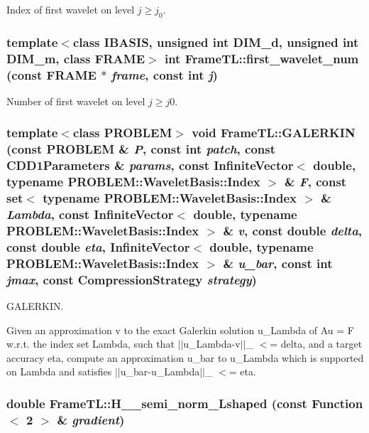 Index of first wavelet on level $j \geq j_0$. \hypertarget{namespaceFrameTL_d2a45d507a64c17ff1cf1edeb7afcd8e}{
\subsubsection[first\_\-wavelet\_\-num]{\setlength{\rightskip}{0pt plus 5cm}template$<$class IBASIS, unsigned int DIM\_\-d, unsigned int DIM\_\-m, class FRAME$>$ int FrameTL::first\_\-wavelet\_\-num (const FRAME $\ast$ {\em frame}, \/  const int {\em j})}}
\label{namespaceFrameTL_d2a45d507a64c17ff1cf1edeb7afcd8e}


Number of first wavelet on level $j \geq j0$. \hypertarget{namespaceFrameTL_5338ae7f2ce93a8449560cc020fa212a}{
\subsubsection[GALERKIN]{\setlength{\rightskip}{0pt plus 5cm}template$<$class PROBLEM$>$ void FrameTL::GALERKIN (const PROBLEM \& {\em P}, \/  const int {\em patch}, \/  const CDD1Parameters \& {\em params}, \/  const InfiniteVector$<$ double, typename PROBLEM::WaveletBasis::Index $>$ \& {\em F}, \/  const set$<$ typename PROBLEM::WaveletBasis::Index $>$ \& {\em Lambda}, \/  const InfiniteVector$<$ double, typename PROBLEM::WaveletBasis::Index $>$ \& {\em v}, \/  const double {\em delta}, \/  const double {\em eta}, \/  InfiniteVector$<$ double, typename PROBLEM::WaveletBasis::Index $>$ \& {\em u\_\-bar}, \/  const int {\em jmax}, \/  const CompressionStrategy {\em strategy})}}
\label{namespaceFrameTL_5338ae7f2ce93a8449560cc020fa212a}


GALERKIN. 

Given an approximation v to the exact Galerkin solution u\_\-Lambda of Au = F w.r.t. the index set Lambda, such that $|$$|$u\_\-Lambda-v$|$$|$\_ $<$= delta, and a target accuracy eta, compute an approximation u\_\-bar to u\_\-Lambda which is supported on Lambda and satisfies $|$$|$u\_\-bar-u\_\-Lambda$|$$|$\_ $<$= eta. \hypertarget{namespaceFrameTL_3ce808a3f26fc1938139488a730e994d}{
\subsubsection[H\_\-1\_\-semi\_\-norm\_\-Lshaped]{\setlength{\rightskip}{0pt plus 5cm}double FrameTL::H\_\_\-semi\_\-norm\_\-Lshaped (const Function$<$ 2 $>$ \& {\em gradient})}}
\label{namespaceFrameTL_3ce808a3f26fc1938139488a730e994d}


